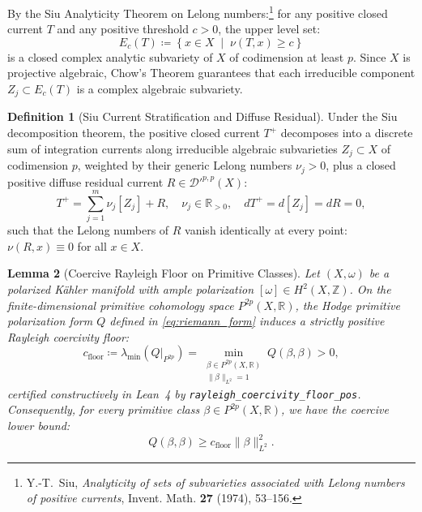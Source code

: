 \documentclass[11pt,a4paper]{article}
\theoremstyle{definition}
\newtheorem{definition}{Definition}[section]
\theoremstyle{plain}
\newtheorem{lemma}[definition]{Lemma}
\begin{document}
By the Siu Analyticity Theorem on Lelong numbers:\footnote{Y.-T.~Siu, \emph{Analyticity of sets of subvarieties associated with Lelong numbers of positive currents}, Invent. Math. \textbf{27} (1974), 53--156.} for any positive closed current $T$ and any positive threshold $c > 0$, the upper level set:
\begin{equation}
    \label{eq:siu_stratum}
    E_c(T) \coloneqq \left\{ x \in X \;\middle|\; \nu(T, x) \ge c \right\}
\end{equation}
is a closed complex analytic subvariety of $X$ of codimension at least $p$. Since $X$ is projective algebraic, Chow's Theorem guarantees that each irreducible component $Z_j \subset E_c(T)$ is a complex algebraic subvariety.

\begin{definition}[Siu Current Stratification and Diffuse Residual]
\label{def:siu_current_stratification}
Under the Siu decomposition theorem, the positive closed current $T^+$ decomposes into a discrete sum of integration currents along irreducible algebraic subvarieties $Z_j \subset X$ of codimension $p$, weighted by their generic Lelong numbers $\nu_j > 0$, plus a closed positive diffuse residual current $R \in \mathcal{D}'^{p,p}(X)$:
\begin{equation}
    \label{eq:siu_decomposition}
    T^+ = \sum_{j=1}^m \nu_j [Z_j] + R, \quad \nu_j \in \mathbb{R}_{>0}, \quad dT^+ = d[Z_j] = dR = 0,
\end{equation}
such that the Lelong numbers of $R$ vanish identically at every point: $\nu(R, x) \equiv 0$ for all $x \in X$.
\end{definition}

\begin{lemma}[Coercive Rayleigh Floor on Primitive Classes]
\label{lem:rayleigh_coercivity_floor}
Let $(X, \omega)$ be a polarized Kähler manifold with ample polarization $[\omega] \in H^2(X, \mathbb{Z})$. On the finite-dimensional primitive cohomology space $P^{2p}(X, \mathbb{R})$, the Hodge primitive polarization form $Q$ defined in \eqref{eq:riemann_form} induces a strictly positive Rayleigh coercivity floor:
\begin{equation}
    \label{eq:rayleigh_floor_hodge}
    c_{\mathrm{floor}} \coloneqq \lambda_{\min}(Q|_{P^{2p}}) = \min_{\substack{\beta \in P^{2p}(X, \mathbb{R}) \\ \|\beta\|_{L^2} = 1}} Q(\beta, \beta) > 0,
\end{equation}
certified constructively in Lean~4 by \texttt{rayleigh\_coercivity\_floor\_pos}. Consequently, for every primitive class $\beta \in P^{2p}(X, \mathbb{R})$, we have the coercive lower bound:
\begin{equation}
    \label{eq:coercive_quadratic_ineq}
    Q(\beta, \beta) \ge c_{\mathrm{floor}} \|\beta\|_{L^2}^2.
\end{equation}
\end{lemma}
\end{document}
